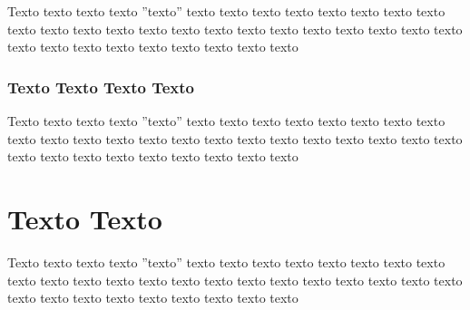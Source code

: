 Texto texto texto texto ''texto'' texto texto texto texto texto texto texto texto texto texto texto texto texto texto texto texto texto texto texto texto texto texto texto texto texto texto texto texto texto texto texto

\subsubsection{Texto Texto Texto Texto}

Texto texto texto texto ''texto'' texto texto texto texto texto texto texto texto texto texto texto texto texto texto texto texto texto texto texto texto texto texto texto texto texto texto texto texto texto texto texto




\section{Texto Texto}

Texto texto texto texto ''texto'' texto texto texto texto texto texto texto texto texto texto texto texto texto texto texto texto texto texto texto texto texto texto texto texto texto texto texto texto texto texto texto